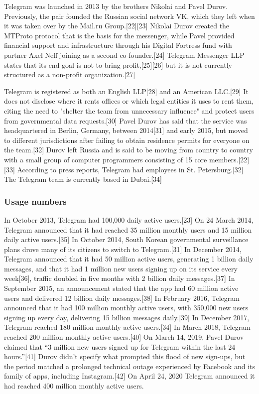 \documentclass[12pt]{article}
\begin{document}
Telegram was launched in 2013 by the brothers Nikolai and Pavel Durov. Previously, the pair founded the Russian social network VK, which they left when it was taken over by the Mail.ru Group.[22][23] Nikolai Durov created the MTProto protocol that is the basis for the messenger, while Pavel provided financial support and infrastructure through his Digital Fortress fund with partner Axel Neff joining as a second co-founder.[24] Telegram Messenger LLP states that its end goal is not to bring profit,[25][26] but it is not currently structured as a non-profit organization.[27]

Telegram is registered as both an English LLP[28] and an American LLC.[29] It does not disclose where it rents offices or which legal entities it uses to rent them, citing the need to "shelter the team from unnecessary influence" and protect users from governmental data requests.[30] Pavel Durov has said that the service was headquartered in Berlin, Germany, between 2014[31] and early 2015, but moved to different jurisdictions after failing to obtain residence permits for everyone on the team.[32] Durov left Russia and is said to be moving from country to country with a small group of computer programmers consisting of 15 core members.[22][33] According to press reports, Telegram had employees in St. Petersburg.[32] The Telegram team is currently based in Dubai.[34] 








\subsubsection{Usage numbers}




In October 2013, Telegram had 100,000 daily active users.[23] On 24 March 2014, Telegram announced that it had reached 35 million monthly users and 15 million daily active users.[35] In October 2014, South Korean governmental surveillance plans drove many of its citizens to switch to Telegram.[31] In December 2014, Telegram announced that it had 50 million active users, generating 1 billion daily messages, and that it had 1 million new users signing up on its service every week[36], traffic doubled in five months with 2 billion daily messages.[37] In September 2015, an announcement stated that the app had 60 million active users and delivered 12 billion daily messages.[38] In February 2016, Telegram announced that it had 100 million monthly active users, with 350,000 new users signing up every day, delivering 15 billion messages daily.[39] In December 2017, Telegram reached 180 million monthly active users.[34] In March 2018, Telegram reached 200 million monthly active users.[40] On March 14, 2019, Pavel Durov claimed that “3 million new users signed up for Telegram within the last 24 hours.”[41] Durov didn't specify what prompted this flood of new sign-ups, but the period matched a prolonged technical outage experienced by Facebook and its family of apps, including Instagram.[42] On April 24, 2020 Telegram announced it had reached 400 million monthly active users.
\end{document}
